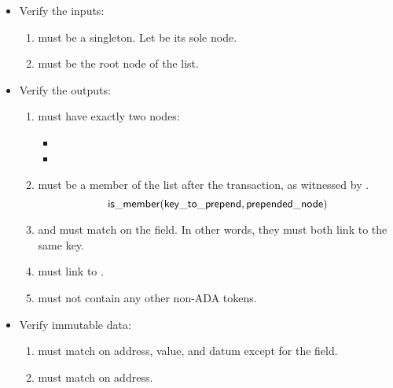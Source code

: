\documentclass[../midgard.tex]{subfiles}
\begin{document}
\begin{description}
\begin{itemize}
            \item Verify the inputs:
            \begin{enumerate}[resume]
                \item {} must be a singleton.
                  Let  be its sole node.
                \item {} must be the root node of the list.
            \end{enumerate}
            
            \item Verify the outputs:
            \begin{enumerate}[resume]
                \item {} must have exactly two nodes:
                    \begin{itemize}
                        \item {}
                        \item {}  
                    \end{itemize}
                \item {} must be a member of the list after the transaction, as witnessed by .
                    \begin{equation*}
                        \mathsf{is\_member} (\mathsf{key\_to\_prepend}, \mathsf{prepended\_node})
                    \end{equation*}
                \item {} and  must match on the  field.
                  In other words, they must both link to the same key.
                \item {} must link to .
                \item {} must not contain any other non-ADA tokens.
            \end{enumerate}
            
            \item Verify immutable data:
            \begin{enumerate}[resume]
                \item {} must match  on address, value, and datum except for the  field.
                \item {} must match  on address.
            \end{enumerate}
        \end{itemize}
    

\end{description}
\end{document}
